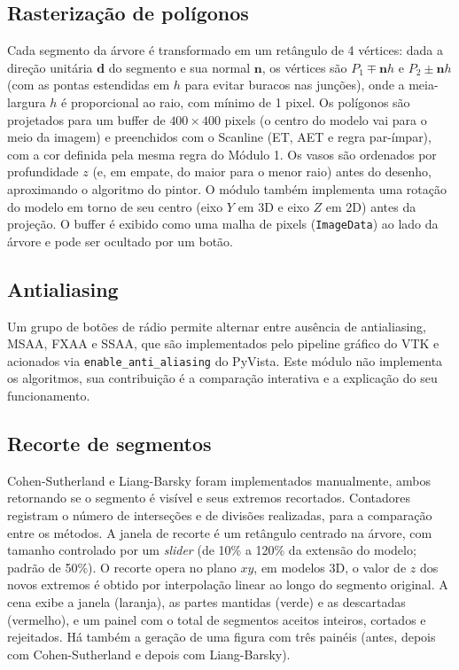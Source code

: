 \subsection{Rasterização de polígonos}
Cada segmento da árvore é transformado em um retângulo de 4 vértices: dada a direção unitária $\mathbf d$ do segmento e sua normal $\mathbf n$, os vértices são $P_1\mp\mathbf n h$ e $P_2\pm\mathbf n h$ (com as pontas estendidas em $h$ para evitar buracos nas junções), onde a meia-largura $h$ é proporcional ao raio, com mínimo de 1 pixel. Os polígonos são projetados para um buffer de $400\times400$ pixels (o centro do modelo vai para o meio da imagem) e preenchidos com o Scanline (ET, AET e regra par-ímpar), com a cor definida pela mesma regra do Módulo 1. Os vasos são ordenados por profundidade $z$ (e, em empate, do maior para o menor raio) antes do desenho, aproximando o algoritmo do pintor. O módulo também implementa uma rotação do modelo em torno de seu centro (eixo $Y$ em 3D e eixo $Z$ em 2D) antes da projeção. O buffer é exibido como uma malha de pixels (\texttt{ImageData}) ao lado da árvore e pode ser ocultado por um botão.

\subsection{Antialiasing}
Um grupo de botões de rádio permite alternar entre ausência de antialiasing, MSAA, FXAA e SSAA, que são implementados pelo pipeline gráfico do VTK e acionados via \texttt{enable\_anti\_aliasing} do PyVista. Este módulo não implementa os algoritmos, sua contribuição é a comparação interativa e a explicação do seu funcionamento.

\subsection{Recorte de segmentos}
Cohen-Sutherland e Liang-Barsky foram implementados manualmente, ambos retornando se o segmento é visível e seus extremos recortados. Contadores registram o número de interseções e de divisões realizadas, para a comparação entre os métodos. A janela de recorte é um retângulo centrado na árvore, com tamanho controlado por um \emph{slider} (de 10\% a 120\% da extensão do modelo; padrão de 50\%). O recorte opera no plano $xy$, em modelos 3D, o valor de $z$ dos novos extremos é obtido por interpolação linear ao longo do segmento original. A cena exibe a janela (laranja), as partes mantidas (verde) e as descartadas (vermelho), e um painel com o total de segmentos aceitos inteiros, cortados e rejeitados. Há também a geração de uma figura com três painéis (antes, depois com Cohen-Sutherland e depois com Liang-Barsky).

